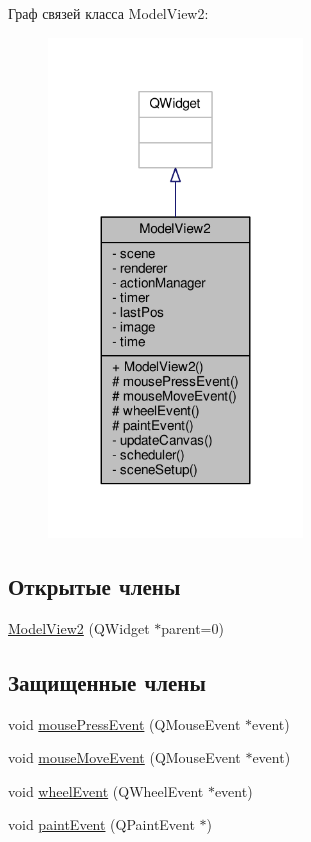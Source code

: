 Граф связей класса Model\+View2\+:
\nopagebreak
\begin{figure}[H]
\begin{center}
\leavevmode
\includegraphics[width=191pt]{d6/d0f/class_model_view2__coll__graph}
\end{center}
\end{figure}
\subsection*{Открытые члены}
\begin{DoxyCompactItemize}
\item 
\hyperlink{class_model_view2_a49c5f725d0d7540faa5288004c50a867}{Model\+View2} (Q\+Widget $\ast$parent=0)
\end{DoxyCompactItemize}
\subsection*{Защищенные члены}
\begin{DoxyCompactItemize}
\item 
void \hyperlink{class_model_view2_ae59cb67124c0409a250aa17e69aec1bb}{mouse\+Press\+Event} (Q\+Mouse\+Event $\ast$event)
\item 
void \hyperlink{class_model_view2_a60d419fe7b9564a83724bbb51ebdb014}{mouse\+Move\+Event} (Q\+Mouse\+Event $\ast$event)
\item 
void \hyperlink{class_model_view2_a118a304dcb2118dd6d78ff5e3f3cb2f1}{wheel\+Event} (Q\+Wheel\+Event $\ast$event)
\item 
void \hyperlink{class_model_view2_a61d9ca903be6a825c0c72b14fc1f5fb0}{paint\+Event} (Q\+Paint\+Event $\ast$)
\end{DoxyCompactItemize}
